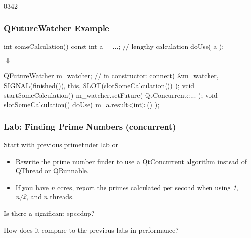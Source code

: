 \begin{slide}[fragile]{0342}
\frametitle{QFutureWatcher Example}
\begin{center}\footnotesize
\begin{cpp}
int someCalculation() {
  const int a = ...; // lengthy calculation
  doUse( a );
}
\end{cpp}
{\Huge$\Downarrow$}
\begin{cpp}
QFutureWatcher m_watcher;
// in constructor:
connect( &m_watcher, SIGNAL(finished()),
         this, SLOT(slotSomeCalculation()) );
void startSomeCalculation() {
  m_watcher.setFuture( QtConcurrent::... );
}
void slotSomeCalculation() {
  doUse( m_a.result<int>() );
}
\end{cpp}
\end{center}
\end{slide}


\begin{slide}
\frametitle{Lab: Finding Prime Numbers (concurrent)}
Start with previous primefinder lab or 
\begin{itemize}
\item Rewrite the prime number finder to use a QtConcurrent algorithm instead of
QThread or QRunnable.
\item If you have \textit{n} cores, report the primes calculated per second when 
using \textit{1}, \textit{n/2}, and \textit{n} threads. 
\end{itemize}

Is there a significant speedup? 

How does it compare to the previous labs in performance?

\end{slide}


